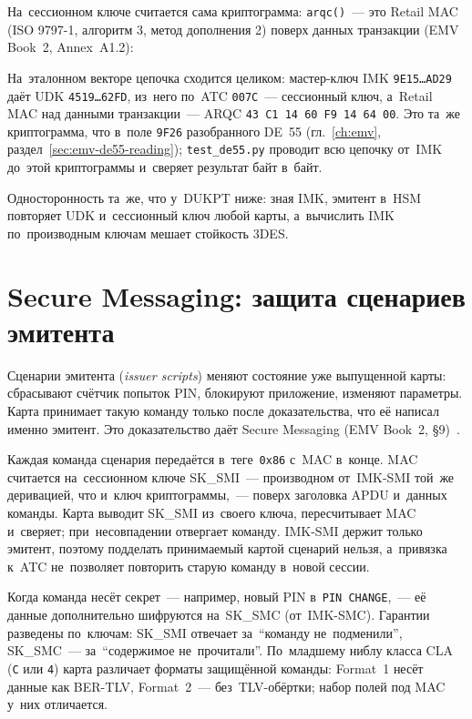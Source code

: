 
На~сессионном ключе считается сама криптограмма: \texttt{arqc()}~--- это Retail
MAC (ISO 9797-1, алгоритм 3, метод дополнения 2) поверх данных транзакции
(EMV Book~2, Annex~A1.2):


На~эталонном векторе цепочка сходится целиком: мастер-ключ IMK \texttt{9E15\dots AD29}
даёт UDK \texttt{4519\dots62FD}, из~него по~ATC \texttt{007C}~--- сессионный ключ,
а~Retail MAC над данными транзакции~--- ARQC \texttt{43\,C1\,14\,60\,F9\,14\,64\,00}.
Это та~же криптограмма, что в~поле \texttt{9F26} разобранного DE~55
(гл.~\ref{ch:emv}, раздел~\ref{sec:emv-de55-reading}); \texttt{test\_de55.py}
проводит всю цепочку от~IMK до~этой криптограммы и~сверяет результат байт в~байт.

Односторонность та~же, что у~DUKPT ниже: зная IMK, эмитент в~HSM повторяет UDK
и~сессионный ключ любой карты, а~вычислить IMK по~производным ключам мешает
стойкость 3DES.

\FloatBarrier
\section{Secure Messaging: защита сценариев эмитента}\label{sec:crypto-secure-messaging}

Сценарии эмитента (\textit{issuer scripts}) меняют
состояние уже выпущенной карты: сбрасывают счётчик попыток PIN, блокируют приложение,
изменяют параметры. Карта принимает такую команду только после доказательства,
что её написал именно эмитент. Это доказательство даёт Secure Messaging
(EMV Book~2, \S9)~\cite{emvco-book2}.

Каждая команда сценария передаётся в~теге~\texttt{0x86} с~MAC в~конце. MAC
считается на~сессионном ключе SK\_SMI~--- производном от~IMK-SMI той~же
деривацией, что и~ключ криптограммы,~--- поверх заголовка APDU и~данных команды. Карта выводит SK\_SMI из~своего ключа,
пересчитывает MAC и~сверяет; при~несовпадении отвергает команду. IMK-SMI держит
только эмитент, поэтому подделать принимаемый картой сценарий нельзя, а~привязка
к~ATC не~позволяет повторить старую команду в~новой сессии.

Когда команда несёт секрет~--- например, новый PIN в~\texttt{PIN CHANGE},~--- её
данные дополнительно шифруются на~SK\_SMC (от~IMK-SMC). Гарантии разведены по~ключам: SK\_SMI отвечает за~\enquote{команду не~подменили}, SK\_SMC~---
за~\enquote{содержимое не~прочитали}. По~младшему ниблу класса CLA (\texttt{C} или \texttt{4}) карта
различает форматы защищённой команды: Format~1 несёт данные как BER-TLV,
Format~2~--- без~TLV-обёртки; набор полей под MAC у~них отличается.

